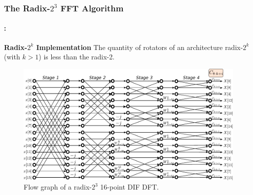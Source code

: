 \begin{frame}
  	\frametitle{\textbf{The Radix-$2^3$ FFT  Algorithm}}
	\framesubtitle{\secname : \subsecname}
	\begin{block}{\centering \textbf{Radix-$2^k$ Implementation}}
		The quantity of rotators of an architecture radix-$2^k$ (with $k>1$) is less than the radix-2.
	\end{block}
    \begin{figure}[h!] \centering
    \includegraphics[width=0.75\paperwidth]{./image/16points_con.pdf}
    \caption{\footnotesize Flow graph of a radix-$2^3$ 16-point DIF DFT.}
    \end{figure}
\end{frame}
    
